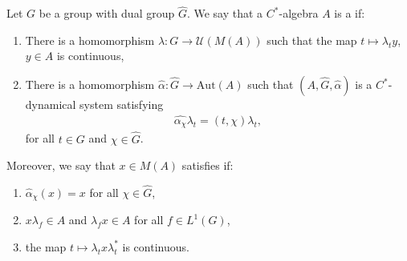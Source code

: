 \begin{definition}
	Let $G$ be a group with dual group $\hat G$. We say that a $C^*$-algebra $A$ is a  if:
	\begin{enumerate}[nosep]
		\item There is a homomorphism $\lambda \colon G \to \mathcal{U}(M(A))$ such that the map $t \mapsto \lambda_t y$, $y \in A$ is continuous,
		\item There is a homomorphism $\hat \alpha \colon \hat G \to \mathrm{Aut}(A)$ such that $(A, \hat G, \hat \alpha )$ is a $C^*$-dynamical system satisfying
			\begin{align*}
				\hat{\alpha_\chi} \lambda_t = (t,\chi) \lambda_t,
			\end{align*}
			for all $t \in G$ and $\chi \in \hat G$.
	\end{enumerate}
	Moreover, we say that $x \in M(A)$ satisfies  if:
	\begin{enumerate}[nosep]
		\item $\hat \alpha_{\chi}(x) = x$ for all $\chi \in \hat G$,
		\item $ x \lambda_f \in A$ and $\lambda_f x \in A$ for all $f \in L^1(G)$,
		\item the map $t \mapsto \lambda_t x \lambda_{t}^*$ is continuous.
	\end{enumerate}
\end{definition}

